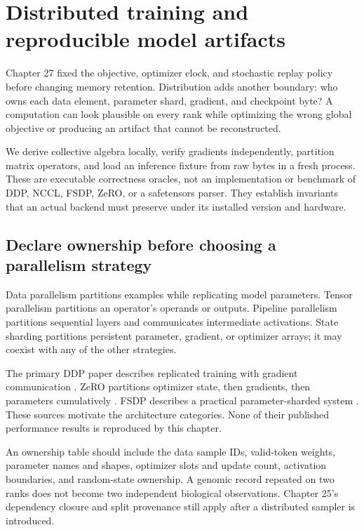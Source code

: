 \chapter{Distributed training and reproducible model artifacts}
Chapter 27 fixed the objective, optimizer clock, and stochastic replay policy before
changing memory retention. Distribution adds another boundary: who owns each data
element, parameter shard, gradient, and checkpoint byte? A computation can look
plausible on every rank while optimizing the wrong global objective or producing
an artifact that cannot be reconstructed.

We derive collective algebra locally, verify gradients independently, partition
matrix operators, and load an inference fixture from raw bytes in a fresh process.
These are executable correctness oracles, not an implementation or benchmark of
DDP, NCCL, FSDP, ZeRO, or a safetensors parser. They establish invariants that an
actual backend must preserve under its installed version and hardware.

\section{Declare ownership before choosing a parallelism strategy}
Data parallelism partitions examples while replicating model parameters.
Tensor parallelism partitions an operator's operands or outputs.
Pipeline parallelism partitions sequential layers and communicates intermediate
activations. State sharding partitions persistent parameter, gradient, or optimizer
arrays; it may coexist with any of the other strategies.

The primary DDP paper describes replicated training with gradient communication
\cite{ddp2020}. ZeRO partitions optimizer state, then gradients, then parameters
cumulatively \cite{zero2020}. FSDP describes a practical parameter-sharded system
\cite{fsdp2023}. These sources motivate the architecture categories. None of their
published performance results is reproduced by this chapter.

An ownership table should include the data sample IDs, valid-token weights,
parameter names and shapes, optimizer slots and update count, activation boundaries,
and random-state ownership. A genomic record repeated on two ranks does not become
two independent biological observations. Chapter 25's dependency closure and split
provenance still apply after a distributed sampler is introduced.

